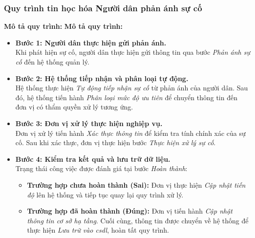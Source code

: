 \subsubsection{Quy trình tin học hóa Người dân phản ánh sự cố}

\textbf{Mô tả quy trình:}
\textbf{Mô tả quy trình:}
\begin{itemize}
    \item \textbf{Bước 1: Người dân thực hiện gửi phản ánh.} \\
    Khi phát hiện sự cố, người dân thực hiện gửi thông tin qua bước \textit{Phản ánh sự cố} đến hệ thống quản lý.
    
    \item \textbf{Bước 2: Hệ thống tiếp nhận và phân loại tự động.} \\
    Hệ thống thực hiện \textit{Tự động tiếp nhận sự cố} từ phản ánh của người dân. Sau đó, hệ thống tiến hành \textit{Phân loại mức độ ưu tiên} để chuyển thông tin đến đơn vị có thẩm quyền xử lý tương ứng.
    
    \item \textbf{Bước 3: Đơn vị xử lý thực hiện nghiệp vụ.} \\
    Đơn vị xử lý tiến hành \textit{Xác thực thông tin} để kiểm tra tính chính xác của sự cố. Sau khi xác thực, đơn vị thực hiện bước \textit{Thực hiện xử lý sự cố}.
    
    \item \textbf{Bước 4: Kiểm tra kết quả và lưu trữ dữ liệu.} \\
    Trạng thái công việc được đánh giá tại bước \textit{Hoàn thành}:
    \begin{itemize}
        \item \textbf{Trường hợp chưa hoàn thành (Sai):} Đơn vị thực hiện \textit{Cập nhật tiến độ} lên hệ thống và tiếp tục quay lại quy trình xử lý.
        \item \textbf{Trường hợp đã hoàn thành (Đúng):} Đơn vị tiến hành \textit{Cập nhật thông tin cơ sở hạ tầng}. Cuối cùng, thông tin được chuyển về hệ thống để thực hiện \textit{Lưu trữ vào \gls{csdl}}, hoàn tất quy trình.
    \end{itemize}
\end{itemize}

